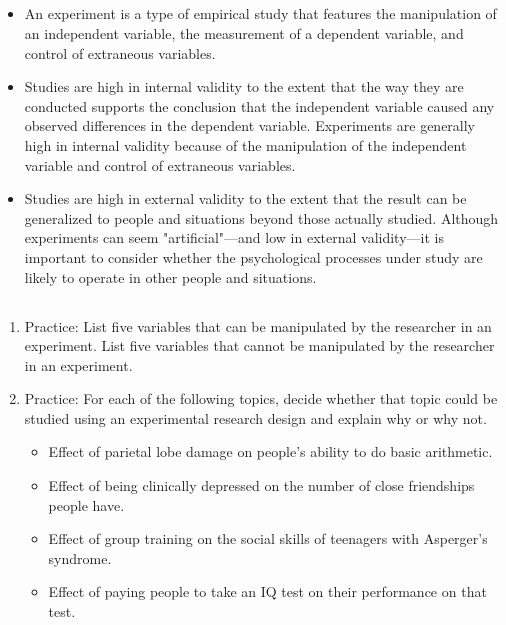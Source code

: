 \subsection{}
\begin{fullwidth}
\begin{itemize}

\item An experiment is a type of empirical study that features the manipulation of an independent variable, the measurement of a dependent variable, and control of extraneous variables.
\item Studies are high in internal validity to the extent that the way they are conducted supports the conclusion that the independent variable caused any observed differences in the dependent variable. Experiments are generally high in internal validity because of the manipulation of the independent variable and control of extraneous variables.
\item Studies are high in external validity to the extent that the result can be generalized to people and situations beyond those actually studied. Although experiments can seem "artificial"---and low in external validity---it is important to consider whether the psychological processes under study are likely to operate in other people and situations.

\end{itemize}
\end{fullwidth}


\subsection{}
\begin{fullwidth}
\begin{enumerate}
\item Practice: List five variables that can be manipulated by the researcher in an experiment. List five variables that cannot be manipulated by the researcher in an experiment.
\item  Practice: For each of the following topics, decide whether that topic could be studied using an experimental research design and explain why or why not.
\begin{itemize}
\item Effect of parietal lobe damage on people's ability to do basic arithmetic.
\item Effect of being clinically depressed on the number of close friendships people have.
\item Effect of group training on the social skills of teenagers with Asperger's syndrome.
\item Effect of paying people to take an IQ test on their performance on that test.

\end{itemize}
\end{enumerate}
\end{fullwidth}


